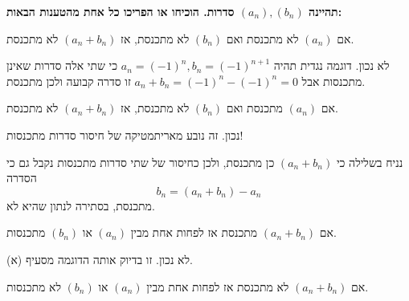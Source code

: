 \textbf{תהיינה
$(a_n),(b_n)$
סדרות.
    הוכיחו או הפריכו כל אחת מהטענות הבאות:}
\bE
     \item
    אם
    $(a_n)$
    לא מתכנסת
    ואם
    $(b_n)$
    לא מתכנסת, אז
    $(a_n+b_n)$
    לא מתכנסת.
    
\begin{solbox}
    לא נכון. דוגמה נגדית תהיה
    $a_n=(-1)^n, b_n=(-1)^{n+1}$
    כי שתי אלה סדרות שאינן מתכנסות אבל
    $a_n+b_n=(-1)^n-(-1)^n=0$
    זו סדרה קבועה ולכן מתכנסת.
\end{solbox}
    \item
    אם
    $(a_n)$
    מתכנסת
    ואם
    $(b_n)$
    לא מתכנסת, אז
    $(a_n+b_n)$
    לא מתכנסת.
    
\begin{solbox}
    נכון. זה נובע מאריתמטיקה של חיסור סדרות מתכנסות!

    נניח בשלילה כי
    $(a_n+b_n)$
    כן מתכנסת, ולכן כחיסור של שתי סדרות מתכנסות נקבל גם כי הסדרה
    $$b_n=(a_n+b_n)-a_n$$
    מתכנסת, בסתירה לנתון שהיא לא.
\end{solbox}
    \item
    אם
    $(a_n+b_n)$
     מתכנסת אז לפחות אחת מבין
    $(a_n)$
    או
    $(b_n)$
    מתכנסות.
    
\begin{solbox}
לא נכון. זו בדיוק אותה הדוגמה מסעיף (א).
\end{solbox}
      \item
    אם
    $(a_n+b_n)$
    לא
     מתכנסת אז לפחות אחת מבין
    $(a_n)$
    או
    $(b_n)$
    לא
    מתכנסות.
    
